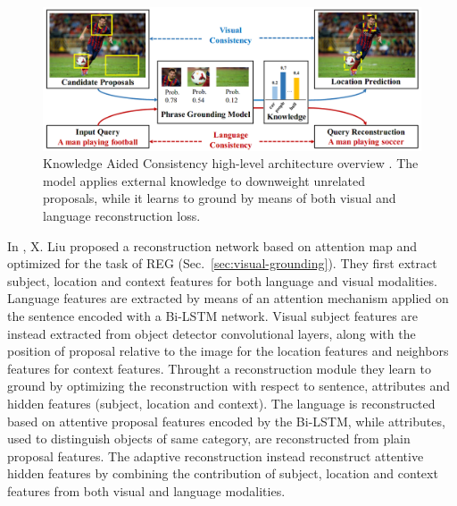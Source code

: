 \begin{figure}
  \centering
  \includegraphics[width=.8\textwidth]{figures/kac-example.png}
  \caption[Knowledge Aided Consistency high-level architecture
  overview]{ Knowledge Aided Consistency high-level architecture
  overview \cite{chen2018knowledge}. The model applies external
  knowledge to downweight unrelated proposals, while it learns to
  ground by means of both visual and language reconstruction loss. }
  \label{fig:kac-example}
\end{figure}

In \cite{liu2019adaptive}, X. Liu \etal{} proposed a reconstruction
network based on attention map and optimized for the task of REG
(Sec.~\ref{sec:visual-grounding}). They first extract subject,
location and context features for both language and visual modalities.
Language features are extracted by means of an attention mechanism
applied on the sentence encoded with a Bi-LSTM network. Visual subject
features are instead extracted from object detector convolutional
layers, along with the position of proposal relative to the image for
the location features and neighbors features for context features.
Throught a reconstruction module they learn to ground by optimizing
the reconstruction with respect to sentence, attributes and hidden
features (subject, location and context). The language is
reconstructed based on attentive proposal features encoded by the
Bi-LSTM, while attributes, used to distinguish objects of same
category, are reconstructed from plain proposal features. The adaptive
reconstruction instead reconstruct attentive hidden features by
combining the contribution of subject, location and context features
from both visual and language modalities.


